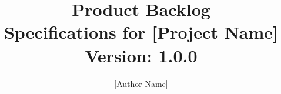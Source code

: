 \title{
	\LARGE{Product Backlog}\\
	\normalsize{Specifications for [Project Name]}\\
	\normalsize{Version: 1.0.0}
	}
\author{[Author Name]}
\maketitle
